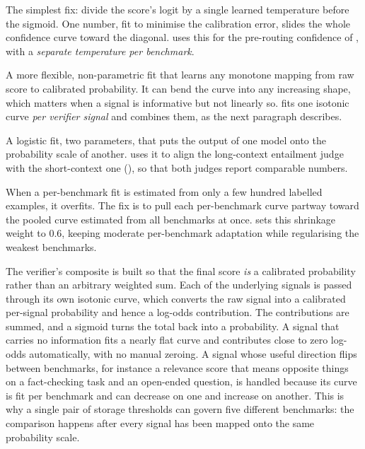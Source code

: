 \begin{description}[leftmargin=0pt, labelsep=0.5em, style=nextline]
  \item[Temperature scaling.] The simplest fix: divide the score's logit by a
  single learned temperature before the sigmoid. One number, fit to minimise the
  calibration error, slides the whole confidence curve toward the diagonal. \caem{}
  uses this for the pre-routing confidence of , with a \emph{separate
  temperature per benchmark}.
  \item[Isotonic regression.] A more flexible, non-parametric fit that learns any
  monotone mapping from raw score to calibrated probability. It can bend the curve
  into any increasing shape, which matters when a signal is informative but not
  linearly so. \caem{} fits one isotonic curve \emph{per verifier signal} and
  combines them, as the next paragraph describes.
  \item[Platt scaling.] A logistic fit, two parameters, that puts the output of one
  model onto the probability scale of another. \caem{} uses it to align the
  long-context entailment judge with the short-context one (),
  so that both judges report comparable numbers.
  \item[Shrinkage toward a pool.] When a per-benchmark fit is estimated from only a
  few hundred labelled examples, it overfits. The fix is to pull each per-benchmark
  curve partway toward the pooled curve estimated from all benchmarks at once.
  \caem{} sets this shrinkage weight to $0.6$, keeping moderate per-benchmark
  adaptation while regularising the weakest benchmarks.
\end{description}

\begin{precise}
The verifier's composite is built so that the final score \emph{is} a calibrated
probability rather than an arbitrary weighted sum. Each of the underlying signals is
passed through its own isotonic curve, which converts the raw signal into a
calibrated per-signal probability and hence a log-odds contribution. The
contributions are summed, and a sigmoid turns the total back into a probability.
A signal that carries no information fits a nearly flat curve and contributes close
to zero log-odds automatically, with no manual zeroing. A signal whose useful
direction flips between benchmarks, for instance a relevance score that means
opposite things on a fact-checking task and an open-ended question, is handled
because its curve is fit per benchmark and can decrease on one and increase on
another. This is why a single pair of storage thresholds can govern five different
benchmarks: the comparison happens after every signal has been mapped onto the same
probability scale.
\end{precise}

